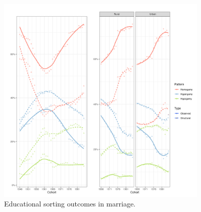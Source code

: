 \begin{figure}[H]
    \centering
    \includegraphics[width=0.9\textwidth]{chapters/chapter4/figures/trends.png}
    \caption{Educational sorting outcomes in marriage.}
    \label{fig:trends_edu_sorting_marriage}
\end{figure}

